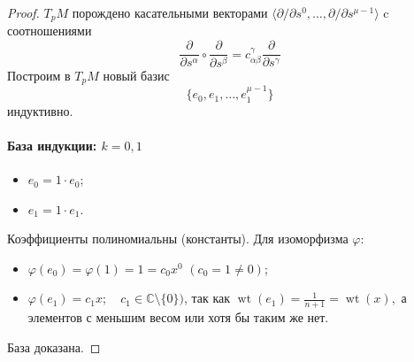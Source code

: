 \documentclass[a4paper, 10pt]{article}
\theoremstyle{plain}
\newcommand{\tang}[1][\hspace{0pt}]{\frac{\partial }{\partial #1}}
\begin{document}
\begin{proof}
   \(T_pM\) порождено касательными векторами \(\langle \partial/\partial s^0, \dots, \partial/\partial s^{\mu-1} \rangle\) c соотношениями \[\tang[s^\alpha] \circ \tang[s^\beta] = c^\gamma_{\alpha\beta}\tang[s^{\gamma}]\]
   Построим в \(T_pM\) новый базис \[\{e_0, e_1, \dots, e_1^{\mu-1}\}\] индуктивно. \par
   \paragraph{База индукции: $k=0,1$}
    \begin{itemize}
        \item $e_0 = 1\cdot e_0$;
        \item $e_1 = 1\cdot e_1$.
    \end{itemize}
    Коэффициенты полиномиальны (константы).
    Для изоморфизма $\varphi$:
    \begin{itemize}
        \item $\varphi(e_0)=\varphi(1)=1=c_0x^0$ $(c_0=1\neq 0)$;
        \item $\varphi(e_1)=c_1x; \quad c_1\in \mathbb{C}\setminus\{0\})$, так как
        \(\operatorname{wt}(e_1)=\frac{1}{n+1}=\operatorname{wt}(x),\)
        а элементов с меньшим весом или хотя бы таким же нет.
    \end{itemize}
База доказана.

\end{proof}
\end{document}
